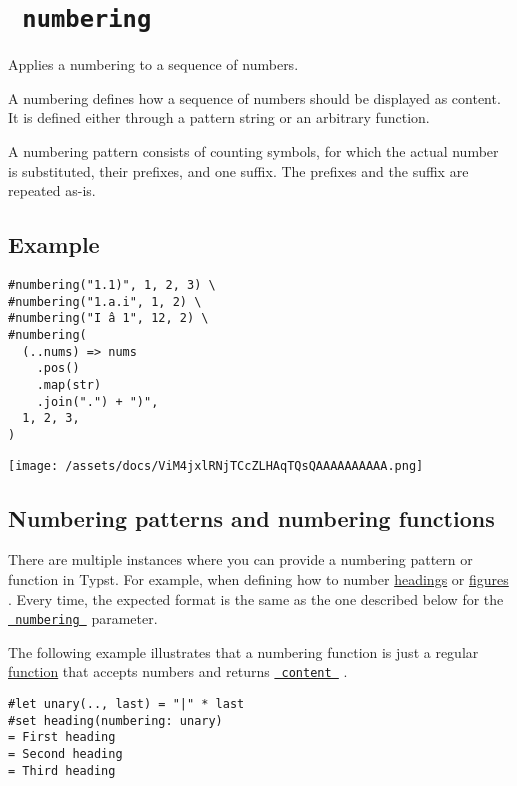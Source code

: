 \section{\texorpdfstring{\texttt{\ numbering\ }}{ numbering }}\label{summary}

Applies a numbering to a sequence of numbers.

A numbering defines how a sequence of numbers should be displayed as
content. It is defined either through a pattern string or an arbitrary
function.

A numbering pattern consists of counting symbols, for which the actual
number is substituted, their prefixes, and one suffix. The prefixes and
the suffix are repeated as-is.

\subsection{Example}\label{example}

\begin{verbatim}
#numbering("1.1)", 1, 2, 3) \
#numbering("1.a.i", 1, 2) \
#numbering("I â 1", 12, 2) \
#numbering(
  (..nums) => nums
    .pos()
    .map(str)
    .join(".") + ")",
  1, 2, 3,
)
\end{verbatim}

\texttt{[image: /assets/docs/ViM4jxlRNjTCcZLHAqTQsQAAAAAAAAAA.png]}

\subsection{Numbering patterns and numbering
functions}\label{numbering-patterns-and-numbering-functions}

There are multiple instances where you can provide a numbering pattern
or function in Typst. For example, when defining how to number
\href{/docs/reference/model/heading/}{headings} or
\href{/docs/reference/model/figure/}{figures} . Every time, the expected
format is the same as the one described below for the
\href{/docs/reference/model/numbering/\#parameters-numbering}{\texttt{\ numbering\ }}
parameter.

The following example illustrates that a numbering function is just a
regular \href{/docs/reference/foundations/function/}{function} that
accepts numbers and returns
\href{/docs/reference/foundations/content/}{\texttt{\ content\ }} .

\begin{verbatim}
#let unary(.., last) = "|" * last
#set heading(numbering: unary)
= First heading
= Second heading
= Third heading
\end{verbatim}

